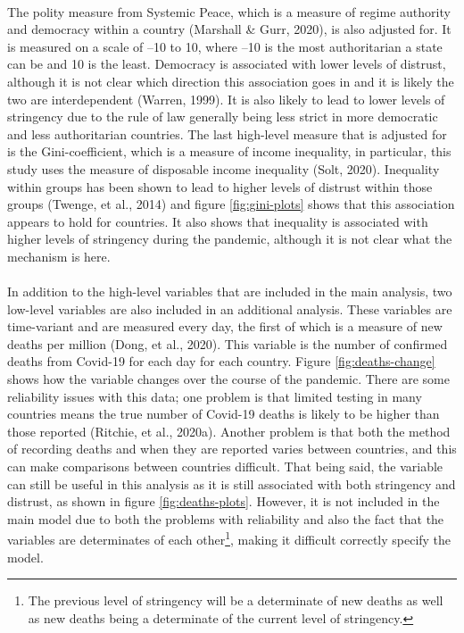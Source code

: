 \documentclass[
  12pt,
]{article}
\begin{document}
~\\
The polity measure from Systemic Peace, which is a measure of regime authority and democracy within a country (Marshall \& Gurr, 2020), is also adjusted for. It is measured on a scale of --10 to 10, where --10 is the most authoritarian a state can be and 10 is the least. Democracy is associated with lower levels of distrust, although it is not clear which direction this association goes in and it is likely the two are interdependent (Warren, 1999). It is also likely to lead to lower levels of stringency due to the rule of law generally being less strict in more democratic and less authoritarian countries. The last high-level measure that is adjusted for is the Gini-coefficient, which is a measure of income inequality, in particular, this study uses the measure of disposable income inequality (Solt, 2020). Inequality within groups has been shown to lead to higher levels of distrust within those groups (Twenge, et al., 2014) and figure \ref{fig:gini-plots} shows that this association appears to hold for countries. It also shows that inequality is associated with higher levels of stringency during the pandemic, although it is not clear what the mechanism is here.\\
~\\
In addition to the high-level variables that are included in the main analysis, two low-level variables are also included in an additional analysis. These variables are time-variant and are measured every day, the first of which is a measure of new deaths per million (Dong, et al., 2020). This variable is the number of confirmed deaths from Covid-19 for each day for each country. Figure \ref{fig:deaths-change} shows how the variable changes over the course of the pandemic. There are some reliability issues with this data; one problem is that limited testing in many countries means the true number of Covid-19 deaths is likely to be higher than those reported (Ritchie, et al., 2020a). Another problem is that both the method of recording deaths and when they are reported varies between countries, and this can make comparisons between countries difficult. That being said, the variable can still be useful in this analysis as it is still associated with both stringency and distrust, as shown in figure \ref{fig:deaths-plots}. However, it is not included in the main model due to both the problems with reliability and also the fact that the variables are determinates of each other\footnote{The previous level of stringency will be a determinate of new deaths as well as new deaths being a determinate of the current level of stringency.}, making it difficult correctly specify the model.\\
\end{document}
